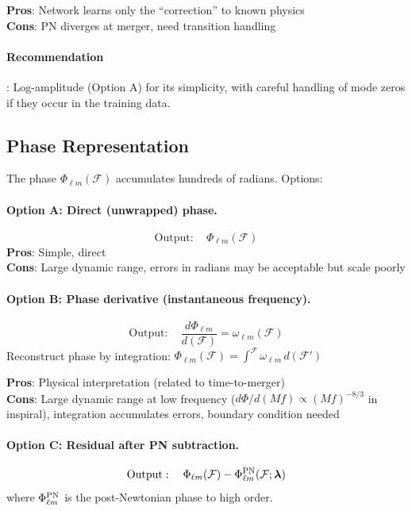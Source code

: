 \documentclass[11pt,a4paper]{article}
\newcommand{\Philm}{\Phi_{\ell m}}
\newcommand{\veclambda}{\bm{\lambda}}
\newcommand{\Mf}{\mathcal{F}}
\begin{document}
\textbf{Pros}: Network learns only the ``correction'' to known physics \\
\textbf{Cons}: PN diverges at merger, need transition handling

\paragraph{Recommendation}: Log-amplitude (Option A) for its simplicity, with careful handling of mode zeros if they occur in the training data.

\subsection{Phase Representation}

The phase $\Philm(\Mf)$ accumulates hundreds of radians. Options:

\paragraph{Option A: Direct (unwrapped) phase.}
\begin{equation}
    \text{Output}: \quad \Philm(\Mf)
\end{equation}
\textbf{Pros}: Simple, direct \\
\textbf{Cons}: Large dynamic range, errors in radians may be acceptable but scale poorly

\paragraph{Option B: Phase derivative (instantaneous frequency).}
\begin{equation}
    \text{Output}: \quad \frac{d\Philm}{d(\Mf)} = \omega_{\ell m}(\Mf)
\end{equation}
Reconstruct phase by integration: $\Philm(\Mf) = \int^{\Mf} \omega_{\ell m} \, d(\Mf')$

\textbf{Pros}: Physical interpretation (related to time-to-merger) \\
\textbf{Cons}: Large dynamic range at low frequency ($d\Phi/d(Mf) \propto (Mf)^{-8/3}$ in inspiral), integration accumulates errors, boundary condition needed

\paragraph{Option C: Residual after PN subtraction.}
\begin{equation}
    \text{Output}: \quad \Philm(\Mf) - \Philm^{\rm PN}(\Mf; \veclambda)
\end{equation}
where $\Philm^{\rm PN}$ is the post-Newtonian phase to high order.
\end{document}
